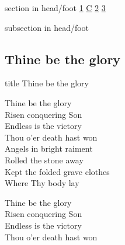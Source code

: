 \documentclass{beamer}
\begin{document}
{
{ 
 {
 \begin{beamercolorbox}[ht=4.5ex,dp=1.5ex,%
      leftskip=.3cm,rightskip=.3cm plus1fil]{section in head/foot}
 \fontsize{12}{25}\selectfont 
\hyperlink{Thine be the glory[]1}{1}
\hyperlink{Thine be the glory[]C}{C}
\hyperlink{Thine be the glory[]2}{2}
\hyperlink{Thine be the glory[]3}{3}
 
 \end{beamercolorbox}%
  \begin{beamercolorbox}[ht=2.5ex,dp=1.125ex,%
   leftskip=.3cm,rightskip=.3cm plus1fil]{subsection in head/foot}
   \insertauthor
 \end{beamercolorbox}%
 }
}
\subsection{ Thine be the glory }

\hypertarget{Thine be the glory[]}{}
\begin{frame}{}
 \vfill
  \centering
  \begin{beamercolorbox}[sep=8pt,center,shadow=true,rounded=true]{title}
    Thine be the glory    
  \end{beamercolorbox}
  \vfill
\end{frame}

\hypertarget{Thine be the glory[]1}{}
\begin{frame}{}
\fontsize{ 18 }{ 23 }\selectfont

Thine be the glory\\ 
Risen conquering Son\\ 
Endless is the victory\\ 
Thou o'er death hast won\\ 
Angels in bright raiment\\ 
Rolled the stone away\\ 
Kept the folded grave clothes\\ 
Where Thy body lay 

\end{frame}

\hypertarget{Thine be the glory[]C}{}
\begin{frame}{}
\fontsize{ 18 }{ 23 }\selectfont

Thine be the glory\\ 
Risen conquering Son\\ 
Endless is the victory\\ 
Thou o'er death hast won 


\end{frame}}
\end{document}
